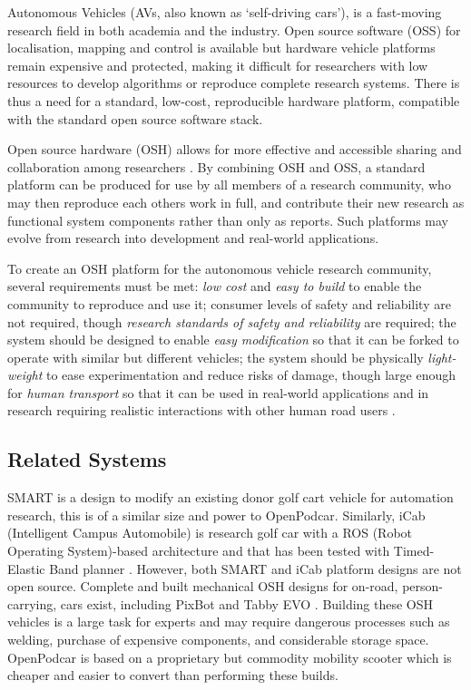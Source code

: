 \documentclass[a4paper]{article}
\begin{document}
	Autonomous Vehicles (AVs, also known as `self-driving cars'), is a fast-moving research field in both academia and the industry. Open source software (OSS) for localisation, mapping and control is available \cite{kato2018autoware} but hardware vehicle platforms remain expensive and protected, making it difficult for researchers with low resources to develop algorithms or reproduce complete research systems. There is thus a need for a standard, low-cost, reproducible hardware platform, compatible with the standard open source software stack.
	
	Open source hardware (OSH) allows for more effective and accessible sharing and collaboration among researchers \cite{fisher2012open}. By combining OSH and OSS, a standard platform can be produced for use by all members of a research community, who may then reproduce each others work in full, and contribute their new research as functional system components rather than only as reports. Such platforms may evolve from research into development and real-world applications.
	
	To create an OSH platform for the autonomous vehicle research community, several requirements must be met: {\em low cost} and {\em easy to build} to enable the community to reproduce and use it; consumer levels of safety and reliability are not required, though {\em research standards of safety and reliability} are required; the system should be designed to enable {\em easy modification} so that it can be forked to operate with similar but different vehicles; the system should be physically {\em light-weight} to ease experimentation and reduce risks of damage, though large enough for {\em human transport} so that it can be used in real-world applications and in research requiring realistic interactions with other human road users \cite{camara2021evaluating, delucia2013effects}.
	
	\subsection{Related Systems}
	\label{related_systems}
	
	SMART \cite{pendleton2015autonomous} is a design to modify an existing donor golf cart vehicle for automation research, this is of a similar size and power to OpenPodcar. Similarly, iCab (Intelligent Campus Automobile) \cite{gomez2016ros} is research golf car with a ROS (Robot Operating System)-based architecture and that has been tested with Timed-Elastic Band planner \cite{marin-plaza2018global}. However, both SMART and iCab platform designs are not open source. Complete and built mechanical OSH designs for on-road, person-carrying, cars exist, including PixBot \cite{pixmovingpixbot} and Tabby EVO \cite{openmotorstabby}. Building these OSH vehicles is a large task for experts and may require dangerous processes such as welding, purchase of expensive components, and considerable storage space. OpenPodcar is based on a proprietary but commodity mobility scooter which is cheaper and easier to convert than performing these builds. 
	
\end{document}
